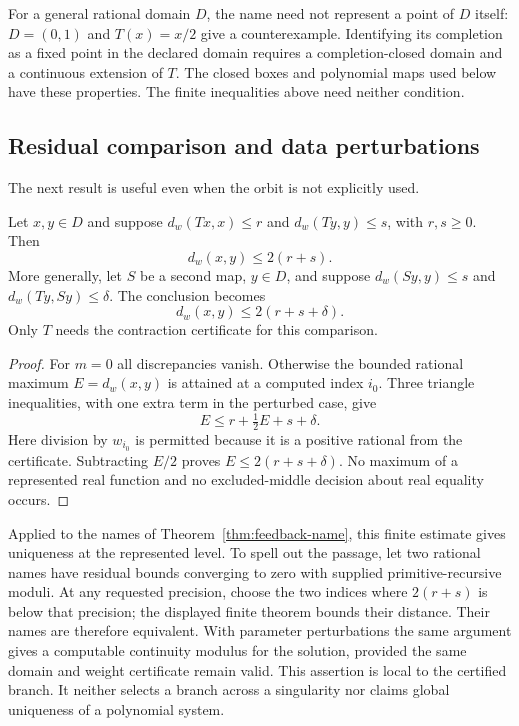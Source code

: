 For a general rational domain $D$, the name need not represent a point of $D$ itself: $D=(0,1)$ and $T(x)=x/2$ give a counterexample. Identifying its completion as a fixed point in the declared domain requires a completion-closed domain and a continuous extension of $T$. The closed boxes and polynomial maps used below have these properties. The finite inequalities above need neither condition.

\subsection{Residual comparison and data perturbations}

The next result is useful even when the orbit is not explicitly used.

\begin{theorem}\label{thm:feedback-residual}
Let $x,y\in D$ and suppose
$d_w(Tx,x)\leq r$ and $d_w(Ty,y)\leq s$, with $r,s\geq0$.
Then
\[
 d_w(x,y)\leq2(r+s).
\]
More generally, let $S$ be a second map, $y\in D$, and suppose
$d_w(Sy,y)\leq s$ and $d_w(Ty,Sy)\leq\delta$.
The conclusion becomes
\begin{equation}\label{eq:perturbed-residual}
 d_w(x,y)\leq2(r+s+\delta).
\end{equation}
Only $T$ needs the contraction certificate for this comparison.
\end{theorem}
\begin{proof}
For $m=0$ all discrepancies vanish. Otherwise the bounded rational maximum
$E=d_w(x,y)$ is attained at a computed index $i_0$. Three triangle
inequalities, with one extra term in the perturbed case, give
\[
 E\leq r+\tfrac12 E+s+\delta.
\]
Here division by $w_{i_0}$ is permitted because it is a positive rational
from the certificate. Subtracting $E/2$ proves
$E\leq2(r+s+\delta)$. No maximum of a represented real function and no
excluded-middle decision about real equality occurs.
\end{proof}

Applied to the names of Theorem~\ref{thm:feedback-name}, this finite estimate
gives uniqueness at the represented level. To spell out the passage, let
two rational names have residual bounds converging to zero with supplied
primitive-recursive moduli. At any requested precision, choose the two
indices where $2(r+s)$ is below that precision; the displayed finite theorem
bounds their distance. Their names are therefore equivalent. With parameter
perturbations the same argument gives a computable continuity modulus for
the solution, provided the same domain and weight certificate remain valid.
This assertion is local to the certified branch. It neither selects a branch
across a singularity nor claims global uniqueness of a polynomial system.

